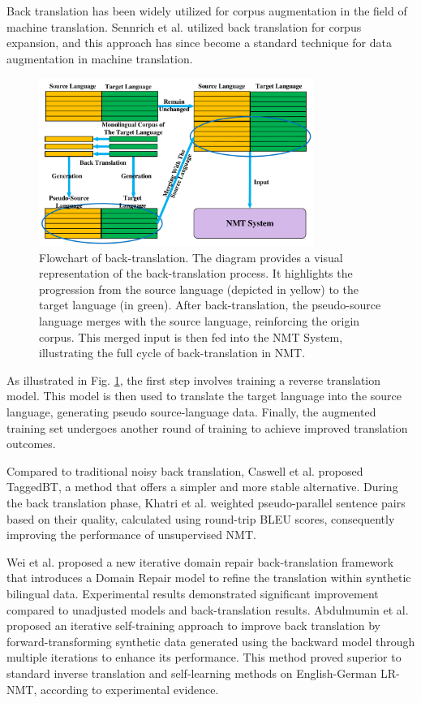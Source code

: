 \documentclass[acmsmall]{acmart}
\begin{document}
Back translation has been widely utilized for corpus augmentation in the field of machine translation. Sennrich et al. \cite{3-5} utilized back translation for corpus expansion, and this approach has since become a standard technique for data augmentation in machine translation. 
\begin{figure}
\centering
\includegraphics[width=0.8\textwidth]{Backtran.pdf} 
\caption{Flowchart of back-translation. The diagram provides a visual representation of the back-translation process. It highlights the progression from the source language (depicted in yellow) to the target language (in green). After back-translation, the pseudo-source language merges with the source language, reinforcing the origin corpus. This merged input is then fed into the NMT System, illustrating the full cycle of back-translation in NMT.} 
\label{fig:three} 
\end{figure}
As illustrated in Fig. \ref{fig:three}, the first step involves training a reverse translation model. This model is then used to translate the target language into the source language, generating pseudo source-language data. Finally, the augmented training set undergoes another round of training to achieve improved translation outcomes.


Compared to traditional noisy back translation, Caswell et al. \cite{n4-13} proposed TaggedBT, a method that offers a simpler and more stable alternative. During the back translation phase, Khatri et al. \cite{n4-14} weighted pseudo-parallel sentence pairs based on their quality, calculated using round-trip BLEU scores, consequently improving the performance of unsupervised NMT. 

Wei et al. \cite{n4-15} proposed a new iterative domain repair back-translation framework that introduces a Domain Repair model to refine the translation within synthetic bilingual data. Experimental results demonstrated significant improvement compared to unadjusted models and back-translation results. Abdulmumin et al. \cite{n4-16} proposed an iterative self-training approach to improve back translation by forward-transforming synthetic data generated using the backward model through multiple iterations to enhance its performance. This method proved superior to standard inverse translation and self-learning methods on English-German LR-NMT, according to experimental evidence. 
\end{document}
